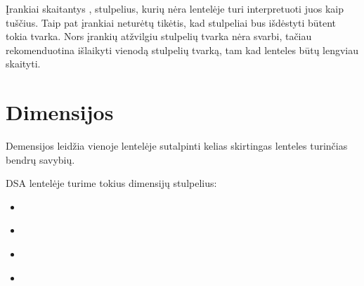 \documentclass[letterpaper,10pt,lithuanian]{sphinxmanual}
\begin{document}
\sphinxAtStartPar
Įrankiai skaitantys {\hyperref[\detokenize{savokos:term-DSA}]{}}, stulpelius, kurių nėra lentelėje turi
interpretuoti juos kaip tuščius. Taip pat įrankiai neturėtų tikėtis, kad stulpeliai
bus išdėstyti būtent tokia tvarka. Nors įrankių atžvilgiu stulpelių tvarka nėra
svarbi, tačiau rekomenduotina išlaikyti vienodą stulpelių tvarką, tam kad
lenteles būtų lengviau skaityti.

\sphinxstepscope


\section{Dimensijos}
\label{\detokenize{dimensijos:dimensijos}}\label{\detokenize{dimensijos:id1}}\label{\detokenize{dimensijos::doc}}
\sphinxAtStartPar
Demensijos leidžia vienoje lentelėje sutalpinti kelias skirtingas lenteles
turinčias bendrų savybių.

\sphinxAtStartPar
DSA lentelėje turime tokius dimensijų stulpelius:
\begin{itemize}
\item {} 
\sphinxAtStartPar
{\hyperref[\detokenize{dimensijos:dataset}]{}}

\item {} 
\sphinxAtStartPar
{\hyperref[\detokenize{dimensijos:resource}]{}}

\item {} 
\sphinxAtStartPar
{\hyperref[\detokenize{dimensijos:model}]{}}

\item {} 
\sphinxAtStartPar
{\hyperref[\detokenize{dimensijos:property}]{}}

\end{itemize}
\end{document}
